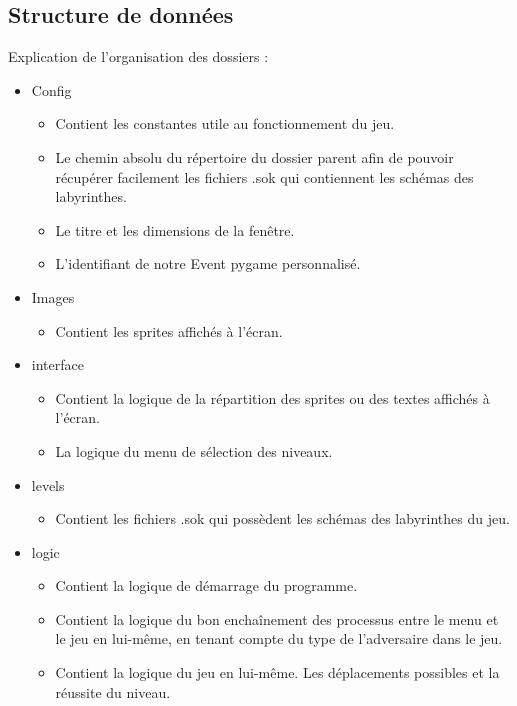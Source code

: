 \documentclass[a4paper,12pt]{article}
\begin{document}
\subsection{Structure de données}

Explication de l'organisation des dossiers :
\begin{itemize}
  \item{Config}
    \begin{itemize}
      \item{Contient les constantes utile au fonctionnement du jeu.}
      \item{Le chemin absolu du répertoire du dossier parent afin de pouvoir récupérer facilement les fichiers .sok qui contiennent les schémas des labyrinthes.}
      \item{Le titre et les dimensions de la fenêtre.}
      \item{L'identifiant de notre Event pygame personnalisé.}
    \end{itemize}
  \item{Images}
    \begin{itemize}
      \item{Contient les sprites affichés à l'écran.}
    \end{itemize}
  \item{interface}
    \begin{itemize}
      \item{Contient la logique de la répartition des sprites ou des textes affichés à l'écran.}
      \item{La logique du menu de sélection des niveaux.}
    \end{itemize}
  \item{levels}
    \begin{itemize}
      \item{Contient les fichiers .sok qui possèdent les schémas des labyrinthes du jeu.}
    \end{itemize}
  \item{logic}
    \begin{itemize}
      \item{Contient la logique de démarrage du programme.}
      \item{Contient la logique du bon enchaînement des processus entre le menu et le jeu en lui-même, en tenant compte du type de l'adversaire dans le jeu.}
      \item{Contient la logique du jeu en lui-même. Les déplacements possibles et la réussite du niveau.}      
    \end{itemize}

\end{itemize}
\end{document}
